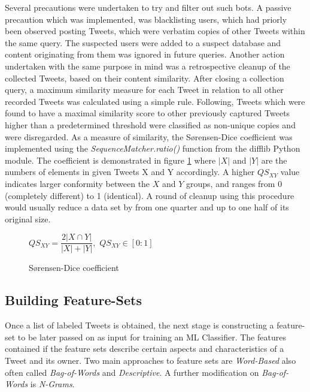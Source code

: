 		\noindent
		Several precautions were undertaken to try and filter out such bots. A passive precaution which was implemented, was blacklisting users, which had priorly been observed posting Tweets, which were verbatim copies of other Tweets within the same query. The suspected users were added to a suspect database and content originating from them was ignored in future queries. Another action undertaken with the same purpose in mind was a retrospective cleanup of the collected Tweets, based on their content similarity. After closing a collection query, a maximum similarity measure for each Tweet in relation to all other recorded Tweets was calculated using a simple rule. Following, Tweets which were found to have a maximal similarity score to other previously captured Tweets  higher than a predetermined threshold were classified as non-unique copies and were disregarded. As a measure of similarity, the S\o rensen-Dice coefficient \cite{sorensen1948method} was implemented  using the \textit{SequenceMatcher.ratio()} function from the difflib Python module. The coefficient is demonstrated in figure \ref{fig:sorenson_dice} where $|X|$ and $|Y|$ are the numbers of elements in given Tweets X and Y accordingly. A higher $ QS_{XY} $ value indicates larger conformity between the $ X $ and $ Y $ groups, and ranges from 0 (completely different) to 1 (identical). A round of cleanup using this procedure would usually reduce a data set by from one quarter and up to one half of its original size.
		
		\begin{figure}[h]
			\begin{center}
				$QS_{XY} = \dfrac{2|X\cap Y|}{|X|+|Y|},$ \hspace{10pt}  $QS_{XY} \in [0:1]$
			\end{center}
			\caption{S\o rensen-Dice coefficient}
			\label{fig:sorenson_dice}
		\end{figure}
		
	\subsection{Building Feature-Sets}
	\label{build_features}
	Once a list of labeled Tweets is obtained, the next stage is constructing a feature-set to be later passed on as input for training an ML Classifier. The features contained if the feature sets describe certain aspects and characteristics of a Tweet and its owner. Two main approaches to feature sets are \textit{Word-Based} also often called \textit{Bag-of-Words} and \textit{Descriptive}. A further modification on \textit{Bag-of-Words} is \textit{N-Grams}.
	
